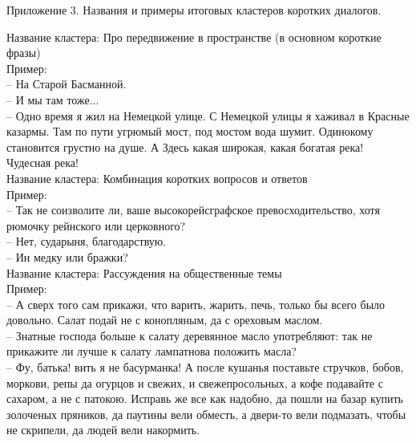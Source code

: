 \documentclass[a4paper,14pt]{article}
\begin{document}
\pagebreak
\begin{flushright}
Приложение 3. Названия и примеры итоговых кластеров коротких диалогов.
\end{flushright}
 \indent
Название кластера: Про передвижение в пространстве (в основном короткие фразы)\\
Пример: \\
-- На Старой Басманной. \\
-- И мы там тоже... \\
-- Одно время я жил на Немецкой улице. С Немецкой улицы я хаживал в Красные казармы. Там
              по пути угрюмый мост, под мостом вода шумит. Одинокому становится грустно на душе. А Здесь какая широкая, какая богатая река! Чудесная река! \\



Название кластера: Комбинация коротких вопросов и ответов\\
Пример: \\
-- Так не соизволите ли, ваше высокорейсграфское превосходительство, хотя рюмочку
              рейнского или церковного? \\
-- Нет, сударыня, благодарствую. \\
-- Ин медку или бражки? \\



Название кластера: Рассуждения на общественные темы\\
Пример: \\
-- А сверх того сам прикажи, что варить, жарить, печь, только бы всего было довольно.
              Салат подай не с конопляным, да с ореховым маслом. \\
-- Знатные господа больше к салату деревянное масло употребляют: так не прикажите ли
              лучше к салату лампатнова положить масла? \\
-- Фу, батька! вить я не басурманка! А после кушанья поставьте стручков, бобов, моркови,
              репы да огурцов и свежих, и свежепросольных, а кофе подавайте с сахаром, а не с
              патокою. Исправь же все как надобно, да пошли на базар купить золоченых пряников, да
              паутины вели обместь, а двери-то вели подмазать, чтобы не скрипели, да людей вели
              накормить. \\
\end{document}
